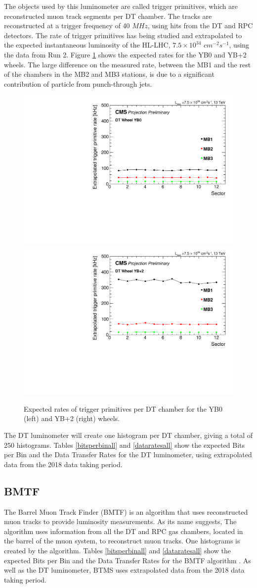The objects used by this luminometer are called trigger primitives, which are reconstructed muon track segments per DT chamber. The tracks are reconstructed at a trigger frequency of  40 $MHz$,  using hits from the DT and RPC detectors. The rate of trigger primitives has being studied and extrapolated to the expected  instantaneous luminosity of the HL-LHC, $7.5\times 10^{34}$ $cm^{-2}s^{-1}$, using  the data from Run 2. Figure \ref{dtrate} shows the expected rates for the YB0 and YB+2 wheels. The large difference on the measured rate, between the MB1 and the rest of the chambers in the MB2 and MB3 stations, is due to a significant contribution of particle from punch-through jets.
\begin{figure}[H]
\centering
\includegraphics[width=.48\textwidth]{Chapter3/DT_Trigger_extraploation_YB.pdf}
\includegraphics[width=.48\textwidth]{Chapter3/DT_Trigger_extraploation_YBp2.pdf}
\caption[Expected rates of trigger primitives per DT chamber]{Expected rates of trigger primitives per DT chamber for the YB0 (left) and YB+2 (right) wheels.}
\label{dtrate}
\end{figure}
The DT luminometer will create one histogram per DT chamber, giving a total of 250 histograms. Tables \ref{bitsperbinall} and \ref{dataratesall} show the expected Bits per Bin and the  Data Transfer Rates for the DT luminometer, using extrapolated data from the 2018 data taking period.
\subsection*{BMTF }
The Barrel Muon Track Finder (BMTF) is an algorithm that uses reconstructed muon tracks to provide luminosity measurements. As its name suggests, The algorithm uses information from all the DT and RPC gas chambers, located in the barrel of the muon system, to reconstruct muon tracks.
One histograms is created by the algorithm. Tables \ref{bitsperbinall} and \ref{dataratesall} show the expected Bits per Bin and the  Data Transfer Rates for the BMTF algorithm \cite{Bachtis:2648953}. As well as the DT luminometer, BTMS uses  extrapolated data from the 2018 data taking period.
